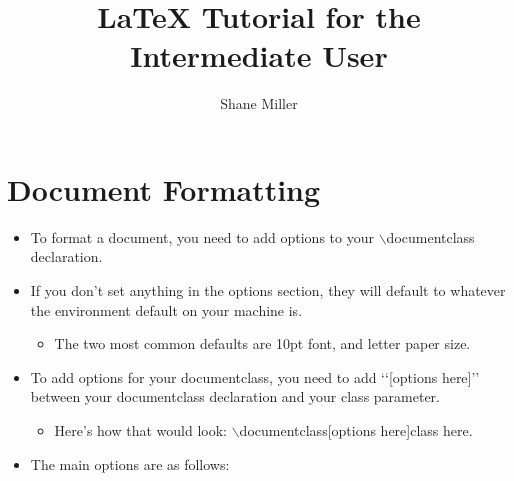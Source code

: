 \documentclass{article}
\title{\LaTeX{} Tutorial for the Intermediate User}
\author{Shane Miller}
\begin{document}
	\maketitle
	\newpage

	\tableofcontents
	\newpage

	\section{Document Formatting}
		\begin{itemize}
			\item To format a document, you need to add options to your $\backslash$documentclass declaration.
			\item If you don\rq{}t set anything in the options section, they will default to whatever the environment default on your machine is.
			\begin{itemize}
				\item The two most common defaults are 10pt font, and letter paper size.
			\end{itemize}
			\item To add options for your documentclass, you need to add \lq\lq{}[options here]\rq\rq{} between your documentclass declaration and your class parameter.
			\begin{itemize}
				\item Here\rq{}s how that would look: $\backslash$documentclass[options here]{class here}.
			\end{itemize}
			\item The main options are as follows:
		\end{itemize}
			\def\arraystretch{1.1}
\end{document}
